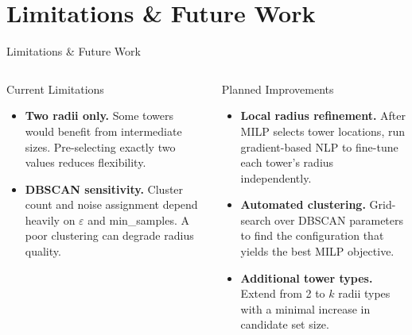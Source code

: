 \section[Limitations \& Outlook]{Limitations \& Future Work}

\begin{frame}[t]{Limitations \& Future Work}{}
    \begin{columns}[T]
        \begin{alertblock}{Current Limitations}
            \begin{itemize}
                \item \textbf{Two radii only.} Some towers would benefit from intermediate sizes. Pre-selecting exactly two values reduces flexibility.

                \vspace{0.2cm}
                \item \textbf{DBSCAN sensitivity.} Cluster count and noise assignment depend heavily on $\varepsilon$ and min\_samples. A poor clustering can degrade radius quality.
            \end{itemize}
        \end{alertblock}

        \begin{block}{Planned Improvements}
            \begin{itemize}
                \item \textbf{Local radius refinement.} After MILP selects tower locations, run gradient-based NLP to fine-tune each tower's radius independently.

                \vspace{0.2cm}
                \item \textbf{Automated clustering.} Grid-search over DBSCAN parameters to find the configuration that yields the best MILP objective.

                \vspace{0.2cm}
                \item \textbf{Additional tower types.} Extend from 2 to $k$ radii types with a minimal increase in candidate set size.
            \end{itemize}
        \end{block}
    \end{columns}
\end{frame}
